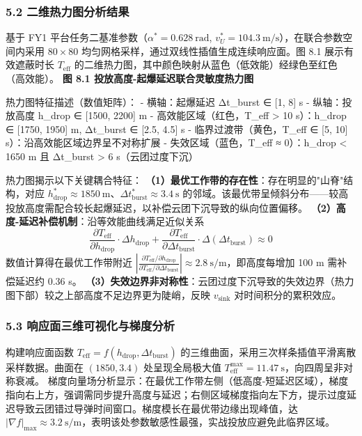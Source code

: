 \documentclass{JXUSTmodeling}
\begin{document}
\subsubsection{5.2 二维热力图分析结果}
基于 FY1 平台任务二基准参数（$\alpha^* = 0.628\ \mathrm{rad}$, $v_U^* = 104.3\ \mathrm{m/s}$），在联合参数空间内采用 $80 \times 80$ 均匀网格采样，通过双线性插值生成连续响应面。图 8.1 展示有效遮蔽时长 $T_{\mathrm{eff}}$ 的二维热力图，其中颜色映射从蓝色（低效能）经绿色至红色（高效能）。
\textbf{图 8.1 投放高度-起爆延迟联合灵敏度热力图}
\begin{python}
热力图特征描述（数值矩阵）：
- 横轴：起爆延迟 Δt_burst ∈ [1, 8] s
- 纵轴：投放高度 h_drop ∈ [1500, 2200] m
- 高效能区域（红色，T_eff > 10 s）：h_drop ∈ [1750, 1950] m, Δt_burst ∈ [2.5, 4.5] s
- 临界过渡带（黄色，T_eff ∈ [5, 10] s）：沿高效能区域边界呈不对称扩展
- 失效区域（蓝色，T_eff ≈ 0）：h_drop < 1650 m 且 Δt_burst > 6 s（云团过度下沉）
\end{python}
热力图揭示以下关键耦合特征：
\textbf{（1）最优工作带的存在性}：存在明显的"山脊"结构，对应 $h_{\mathrm{drop}}^* \approx 1850\ \mathrm{m}$、$\Delta t_{\mathrm{burst}}^* \approx 3.4\ \mathrm{s}$ 的邻域。该最优带呈倾斜分布——较高投放高度需配合较长起爆延迟，以补偿云团下沉导致的纵向位置偏移。
\textbf{（2）高度-延迟补偿机制}：沿等效能曲线满足近似关系
\begin{equation}
\frac{\partial T_{\mathrm{eff}}}{\partial h_{\mathrm{drop}}} \cdot \Delta h_{\mathrm{drop}} + \frac{\partial T_{\mathrm{eff}}}{\partial \Delta t_{\mathrm{burst}}} \cdot \Delta (\Delta t_{\mathrm{burst}}) \approx 0 \tag{8.7}
\end{equation}
数值计算得在最优工作带附近 $\left|\frac{\partial T_{\mathrm{eff}}/\partial h_{\mathrm{drop}}}{\partial T_{\mathrm{eff}}/\partial \Delta t_{\mathrm{burst}}}\right| \approx 2.8\ \mathrm{s/m}$，即高度每增加 100 m 需补偿延迟约 0.36 s。
\textbf{（3）失效边界非对称性}：云团过度下沉导致的失效边界（热力图下部）较之上部高度不足边界更为陡峭，反映 $v_{\mathrm{sink}}$ 对时间积分的累积效应。
\subsubsection{5.3 响应面三维可视化与梯度分析}
构建响应面函数 $T_{\mathrm{eff}} = f(h_{\mathrm{drop}}, \Delta t_{\mathrm{burst}})$ 的三维曲面，采用三次样条插值平滑离散采样数据。曲面在 $(1850, 3.4)$ 处呈现全局极大值 $T_{\mathrm{eff}}^{\max} = 11.47\ \mathrm{s}$，向四周呈非对称衰减。
梯度向量场分析显示：在最优工作带左侧（低高度-短延迟区域），梯度指向右上方，强调需同步提升高度与延迟；右侧区域梯度指向左下方，提示过度延迟导致云团错过导弹时间窗口。梯度模长在最优带边缘出现峰值，达 $|\nabla f|_{\max} \approx 3.2\ \mathrm{s/m}$，表明该处参数敏感性最强，实战投放应避免此临界区域。
\end{document}
